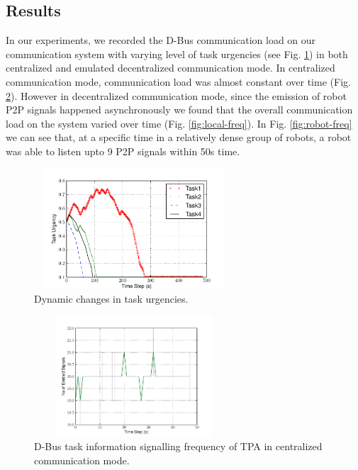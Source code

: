 \documentclass[draft]{ifacconf}
\begin{document}
\subsection{Results}
In our experiments, we recorded the D-Bus communication load on our communication system with varying level of task urgencies (see Fig. \ref{fig:task-urgency}) in both centralized and emulated decentralized communication mode. In  centralized communication mode, communication load was almost constant over time (Fig. \ref{fig:global-freq}).  However in decentralized communication mode, since the emission of robot P2P signals happened asynchronously we found that the overall communication load on the system varied over time (Fig. \ref{fig:local-freq}). In Fig. \ref{fig:robot-freq} we can see that, at a specific time in a relatively dense group of robots, a robot was able to listen upto 9 P2P signals within 50s time.
\begin{figure}
\centering
\includegraphics[width=7.5cm,height=4.5cm]{./images/PlotUrgencyLog-2010Feb15-171017}    %
\caption{Dynamic changes in task urgencies.} 
\label{fig:task-urgency}
\end{figure}
\begin{figure}
\begin{center}
\includegraphics[width=7.5cm,height=4.5cm]{./images/Global-SignalingFreqStat}    %
\caption{D-Bus task information signalling frequency of TPA in centralized communication mode.} 
\label{fig:global-freq}
\end{center}
\end{figure}
\end{document}
